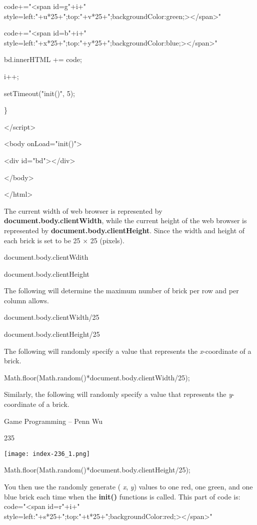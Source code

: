\documentclass[
]{article}
\begin{document}
code+="\textless span id=g"+i+"
style=\textquotesingle left:"+u*25+";top:"+v*25+";backgroundColor:green;\textquotesingle\textgreater\textless/span\textgreater"

code+="\textless span id=b"+i+"
style=\textquotesingle left:"+x*25+";top:"+y*25+";backgroundColor:blue;\textquotesingle\textgreater\textless/span\textgreater"

bd.innerHTML += code;

i++;

setTimeout("init()", 5);

\}

\textless/script\textgreater{}

\textless body onLoad="init()"\textgreater{}

\textless div id="bd"\textgreater\textless/div\textgreater{}

\textless/body\textgreater{}

\textless/html\textgreater{}

The current width of web browser is represented by
\textbf{document.body.clientWidth}, while the current height of the web
browser is represented by \textbf{document.body.clientHeight}. Since the
width and height of each brick is set to be 25 × 25 (pixels).

document.body.clientWdith

document.body.clientHeight

The following will determine the maximum number of brick per row and per
column allows.

document.body.clientWidth/25

document.body.clientHeight/25

The following will randomly specify a value that represents the
\emph{x}-coordinate of a brick.

Math.floor(Math.random()*document.body.clientWidth/25);

Similarly, the following will randomly specify a value that represents
the \emph{y}-coordinate of a brick.

Game Programming -- Penn Wu

235

\protect\hypertarget{index_split_012.htmlux5cux23p236}{}{}\texttt{[image: index-236\_1.png]}

Math.floor(Math.random()*document.body.clientHeight/25);

You then use the randomly generate ( \emph{x}, \emph{y}) values to one
red, one green, and one blue brick each time when the \textbf{init()}
functions is called. This part of code is: code="\textless span
id=r"+i+"
style=\textquotesingle left:"+s*25+";top:"+t*25+";backgroundColor:red;\textquotesingle\textgreater\textless/span\textgreater"
\end{document}
